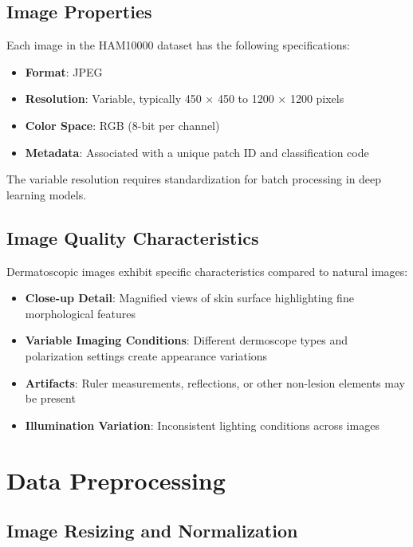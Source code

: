 \subsection{Image Properties}

Each image in the HAM10000 dataset has the following specifications:

\begin{itemize}
    \item \textbf{Format}: JPEG
    \item \textbf{Resolution}: Variable, typically 450 × 450 to 1200 × 1200 pixels
    \item \textbf{Color Space}: RGB (8-bit per channel)
    \item \textbf{Metadata}: Associated with a unique patch ID and classification code
\end{itemize}

The variable resolution requires standardization for batch processing in deep learning models.

\subsection{Image Quality Characteristics}

Dermatoscopic images exhibit specific characteristics compared to natural images:

\begin{itemize}
    \item \textbf{Close-up Detail}: Magnified views of skin surface highlighting fine morphological features
    \item \textbf{Variable Imaging Conditions}: Different dermoscope types and polarization settings create appearance variations
    \item \textbf{Artifacts}: Ruler measurements, reflections, or other non-lesion elements may be present
    \item \textbf{Illumination Variation}: Inconsistent lighting conditions across images
\end{itemize}

\section{Data Preprocessing}

\subsection{Image Resizing and Normalization}

